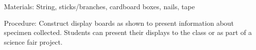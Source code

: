 \begin{multicols}{2}
\begin{description*}
\item[Materials:]{String, sticks/branches, cardboard boxes, nails, tape}
\item[Procedure:]{Construct display boards as shown to present information about specimen collected. Students can present their displays to the class or as part of a science fair project.}
\end{description*}



\end{multicols}

\pagebreak